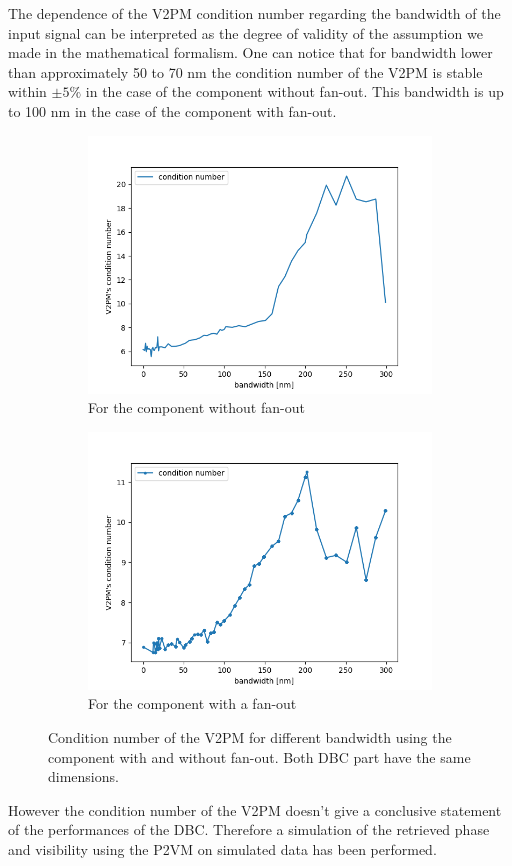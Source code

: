 The dependence of the V2PM condition number regarding the bandwidth of the input signal can be interpreted as the degree of validity of the assumption we made in the mathematical formalism. One can notice that for bandwidth lower than approximately 50 to 70 \si{\nano\meter}  the condition number of the V2PM is stable within $\pm 5 \%$ in the case of the component without fan-out. This bandwidth is up to 100 nm in the case of the component with fan-out. 


\begin{figure}[htbp]
  \centering
  \begin{subfigure}{.5\textwidth}
  \includegraphics[scale=.5]{picture/cond_BW/cond_nofan.png}
  \caption{For the component without fan-out}
    \end{subfigure}%
  \begin{subfigure}{.5\textwidth}
  \includegraphics[scale=.5]{picture/cond_BW/cond_fan.png}
  \caption{For the component with a fan-out}
  \end{subfigure}
  \caption{Condition number of the V2PM for different
    bandwidth using the component with and without fan-out. Both DBC part have the same dimensions.}
  \label{fig:cond_nofan}
\end{figure}

However the condition number of the V2PM doesn't give a conclusive statement of the performances of the DBC. Therefore a simulation of the retrieved phase and visibility using the P2VM on simulated data has been performed.
